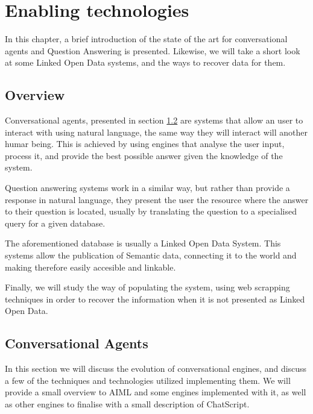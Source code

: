 \chapter{Enabling technologies}
\label{chap:state_of_the_art}

\begin{chapterintro}

In this chapter, a brief introduction of the state of the art for conversational agents and Question Answering is presented. Likewise, we will take a short look at some Linked Open Data systems, and the ways to recover data for them.


\end{chapterintro}

\cleardoublepage

\section{Overview}

Conversational agents, presented in section \ref{sec:conv_agents} are systems that allow an user to interact with using natural language, the same way they will interact will another humar being. This is achieved by using engines that analyse the user input, process it, and provide the best possible answer given the knowledge of the system.

Question answering systems work in a similar way, but rather than provide a response in natural language, they present the user the resource where the answer to their question is located, usually by translating the question to a specialised query for a given database.

The aforementioned database is usually a Linked Open Data System. This systems allow the publication of Semantic data, connecting it to the world and making therefore easily accesible and linkable.

Finally, we will study the way of populating the system, using web scrapping techniques in order to recover the information when it is not presented as Linked Open Data.


\section{Conversational Agents}
\label{sec:conv_agents}

In this section we will discuss the evolution of conversational engines, and discuss a few of the techniques and technologies utilized implementing them. We will provide a small overview to \ac{AIML} and some engines implemented with it, as well as other engines to finalise with a small description of ChatScript.

